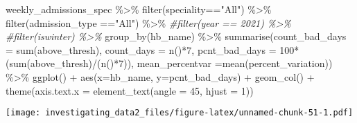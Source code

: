 \documentclass[
]{article}
\newenvironment{Shaded}{\begin{snugshade}}{\end{snugshade}}
\newcommand{\AttributeTok}[1]{\textcolor[rgb]{0.77,0.63,0.00}{#1}}
\newcommand{\CommentTok}[1]{\textcolor[rgb]{0.56,0.35,0.01}{\textit{#1}}}
\newcommand{\DecValTok}[1]{\textcolor[rgb]{0.00,0.00,0.81}{#1}}
\newcommand{\FunctionTok}[1]{\textcolor[rgb]{0.00,0.00,0.00}{#1}}
\newcommand{\NormalTok}[1]{#1}
\newcommand{\SpecialCharTok}[1]{\textcolor[rgb]{0.00,0.00,0.00}{#1}}
\newcommand{\StringTok}[1]{\textcolor[rgb]{0.31,0.60,0.02}{#1}}
\begin{document}
\begin{Shaded}
\begin{Highlighting}[]
\NormalTok{weekly\_admissions\_spec }\SpecialCharTok{\%\textgreater{}\%} 
  \FunctionTok{filter}\NormalTok{(speciality}\SpecialCharTok{==}\StringTok{"All"}\NormalTok{) }\SpecialCharTok{\%\textgreater{}\%} 
  \FunctionTok{filter}\NormalTok{(admission\_type }\SpecialCharTok{==}\StringTok{"All"}\NormalTok{) }\SpecialCharTok{\%\textgreater{}\%} 
  \CommentTok{\#filter(year == 2021) \%\textgreater{}\% }
  \CommentTok{\#filter(iswinter) \%\textgreater{}\%}
  \FunctionTok{group\_by}\NormalTok{(hb\_name) }\SpecialCharTok{\%\textgreater{}\%} 
  \FunctionTok{summarise}\NormalTok{(}\AttributeTok{count\_bad\_days =} \FunctionTok{sum}\NormalTok{(above\_thresh), }
            \AttributeTok{count\_days =} \FunctionTok{n}\NormalTok{()}\SpecialCharTok{*}\DecValTok{7}\NormalTok{, }
            \AttributeTok{pcnt\_bad\_days =} \DecValTok{100}\SpecialCharTok{*}\NormalTok{(}\FunctionTok{sum}\NormalTok{(above\_thresh)}\SpecialCharTok{/}\NormalTok{(}\FunctionTok{n}\NormalTok{()}\SpecialCharTok{*}\DecValTok{7}\NormalTok{)), }
            \AttributeTok{mean\_percentvar =}\FunctionTok{mean}\NormalTok{(percent\_variation)) }\SpecialCharTok{\%\textgreater{}\%}
  \FunctionTok{ggplot}\NormalTok{() }\SpecialCharTok{+}
  \FunctionTok{aes}\NormalTok{(}\AttributeTok{x=}\NormalTok{hb\_name, }\AttributeTok{y=}\NormalTok{pcnt\_bad\_days) }\SpecialCharTok{+}
  \FunctionTok{geom\_col}\NormalTok{() }\SpecialCharTok{+}
  \FunctionTok{theme}\NormalTok{(}\AttributeTok{axis.text.x =} \FunctionTok{element\_text}\NormalTok{(}\AttributeTok{angle =} \DecValTok{45}\NormalTok{, }\AttributeTok{hjust =} \DecValTok{1}\NormalTok{))}
\end{Highlighting}
\end{Shaded}

\texttt{[image: investigating\_data2\_files/figure-latex/unnamed-chunk-51-1.pdf]}
\end{document}

